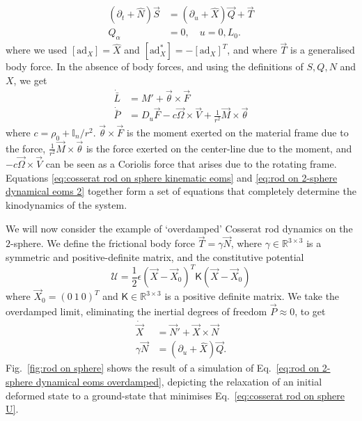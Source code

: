 \begin{subequations} \label{eq:rod on 2-sphere dynamical eoms}
\begin{align}
(\partial_t + \hat{N}) \vec{S} & = (\partial_u + \hat{X}) \vec{Q} + \vec{T} \\
Q_\alpha & = 0, \quad u = 0, L_0.
\end{align}
\end{subequations}
where we used $[\text{ad}_X] = \hat{X}$ and $[\text{ad}^*_X] = -[\text{ad}_X]^T$, and where $\vec{T}$ is a generalised body force. In the absence of body forces, and using the definitions of $S, Q, N$ and $X$, we get
\begin{subequations} 
\begin{align} \label{eq:rod on 2-sphere dynamical eoms 2}
\dot{\bar{L}} & = M' + \vec{\theta} \times \vec{F} \\
\dot{\bar{P}} & = D_u \vec{F} - c \vec{\Omega} \times \vec{V} + \frac{1}{r^2} \vec{M} \times \vec{\theta}
\end{align}
\end{subequations}
where $c = \rho_0 + \mathbb{I}_n/r^2$. $\vec{\theta} \times \vec{F}$ is the moment exerted on the material frame due to the force, $\frac{1}{r^2} \vec{M} \times \vec{\theta}$ is the force exerted on the center-line due to the moment, and $- c \vec{\Omega} \times \vec{V}$ can be seen as a Coriolis force that arises due to the rotating frame. Equations \ref{eq:cosserat rod on sphere kinematic eoms} and \ref{eq:rod on 2-sphere dynamical eoms 2} together form a set of equations that completely determine the kinodynamics of the system.

We will now consider the example of `overdamped' Cosserat rod dynamics on the $2$-sphere. We define the frictional body force $\vec{T} = \gamma \vec{N}$, where $\gamma \in \mathbb{R}^{3\times 3}$ is a symmetric and positive-definite matrix, and the constitutive potential
\begin{equation} \label{eq:cosserat rod on sphere U}
\mathcal{U} = \frac{1}{2} \epsilon (\vec{X} - \vec{X}_0)^T \mathsf{K} (\vec{X} - \vec{X}_0)
\end{equation}
where $\vec{X}_0 = (0\ 1\ 0)^T$ and $\mathsf{K} \in \mathbb{R}^{3 \times 3}$ is a positive definite matrix. We take the overdamped limit, eliminating the inertial degrees of freedom $\vec{P} \approx 0$, to get
\begin{subequations} \label{eq:rod on 2-sphere dynamical eoms overdamped}
\begin{align}
\dot{\vec{X}} & = \vec{N}' + \vec{X} \times \vec{N} \\
\gamma \vec{N} & = (\partial_u + \hat{X}) \vec{Q}.
\end{align}
\end{subequations}
Fig.~\ref{fig:rod on sphere} shows the result of a simulation of Eq.~\ref{eq:rod on 2-sphere dynamical eoms overdamped}, depicting the relaxation of an initial deformed state to a ground-state that minimises Eq.~\ref{eq:cosserat rod on sphere U}.

